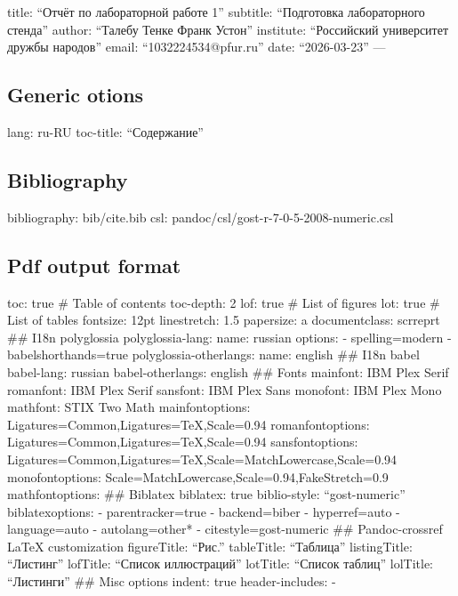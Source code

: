 title: ``Отчёт по лабораторной работе 1'' subtitle: ``Подготовка
лабораторного стенда'' author: ``Талебу Тенке Франк Устон'' institute:
``Российский университет дружбы народов'' email: ``1032224534@pfur.ru''
date: ``2026-03-23'' ---

\subsection{Generic otions}\label{generic-otions}

lang: ru-RU toc-title: ``Содержание''

\subsection{Bibliography}\label{bibliography}

bibliography: bib/cite.bib csl: pandoc/csl/gost-r-7-0-5-2008-numeric.csl

\subsection{Pdf output format}\label{pdf-output-format}

toc: true \# Table of contents toc-depth: 2 lof: true \# List of figures
lot: true \# List of tables fontsize: 12pt linestretch: 1.5 papersize: a
documentclass: scrreprt \#\# I18n polyglossia polyglossia-lang: name:
russian options: - spelling=modern - babelshorthands=true
polyglossia-otherlangs: name: english \#\# I18n babel babel-lang:
russian babel-otherlangs: english \#\# Fonts mainfont: IBM Plex Serif
romanfont: IBM Plex Serif sansfont: IBM Plex Sans monofont: IBM Plex
Mono mathfont: STIX Two Math mainfontoptions:
Ligatures=Common,Ligatures=TeX,Scale=0.94 romanfontoptions:
Ligatures=Common,Ligatures=TeX,Scale=0.94 sansfontoptions:
Ligatures=Common,Ligatures=TeX,Scale=MatchLowercase,Scale=0.94
monofontoptions: Scale=MatchLowercase,Scale=0.94,FakeStretch=0.9
mathfontoptions: \#\# Biblatex biblatex: true biblio-style:
``gost-numeric'' biblatexoptions: - parentracker=true - backend=biber -
hyperref=auto - language=auto - autolang=other* - citestyle=gost-numeric
\#\# Pandoc-crossref LaTeX customization figureTitle: ``Рис.''
tableTitle: ``Таблица'' listingTitle: ``Листинг'' lofTitle: ``Список
иллюстраций'' lotTitle: ``Список таблиц'' lolTitle: ``Листинги'' \#\#
Misc options indent: true header-includes: -

\usepackage{indentfirst}

